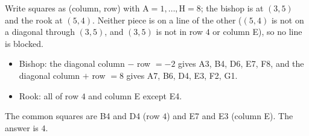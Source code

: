 Write squares as (column, row) with A$=1,\dots,$H$=8$; the bishop is at $(3,5)$ and the rook at $(5,4)$. Neither piece is on a line of the other ($(5,4)$ is not on a diagonal through $(3,5)$, and $(3,5)$ is not in row $4$ or column E), so no line is blocked.
\begin{itemize}
\item Bishop: the diagonal column $-$ row $=-2$ gives A3, B4, D6, E7, F8, and the diagonal column $+$ row $=8$ gives A7, B6, D4, E3, F2, G1.
\item Rook: all of row $4$ and column E except E4.
\end{itemize}
The common squares are B4 and D4 (row $4$) and E7 and E3 (column E). The answer is $\boxed{4}$.
